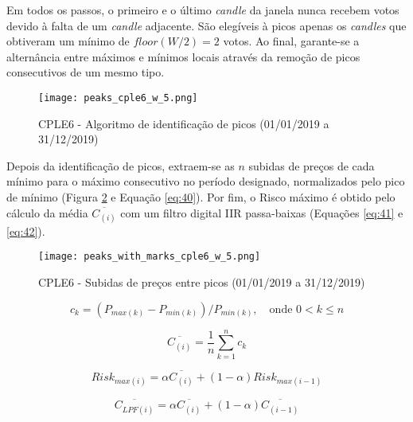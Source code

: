 \begin{itemize}
    Em todos os passos, o primeiro e o último \textit{candle} da janela nunca recebem votos devido à falta de um \textit{candle} adjacente. São elegíveis à picos apenas os \textit{candles} que obtiveram um mínimo de \begin{math}  floor(W / 2) = 2 \end{math} votos. Ao final, garante-se a alternância entre máximos e mínimos locais através da remoção de picos consecutivos de um mesmo tipo.

    \begin{figure}[!htb]
        \texttt{[image: peaks\_cple6\_w\_5.png]}
        \centering
        \caption{CPLE6 - Algoritmo de identificação de picos (01/01/2019 a 31/12/2019)}
        \label{fig:106}
    \end{figure}

    Depois da identificação de picos, extraem-se as \begin{math} n \end{math} subidas de preços de cada mínimo para o máximo consecutivo no período designado, normalizados pelo pico de mínimo (Figura \ref{fig:107} e Equação \ref{eq:40}). Por fim, o Risco máximo é obtido pelo cálculo da média \begin{math} \overline{C_{(i)}} \end{math} com um filtro digital IIR passa-baixas (Equações \ref{eq:41} e \ref{eq:42}).

    \begin{figure}[!htb]
        \texttt{[image: peaks\_with\_marks\_cple6\_w\_5.png]}
        \centering
        \caption{CPLE6 - Subidas de preços entre picos (01/01/2019 a 31/12/2019)}
        \label{fig:107}
    \end{figure}

    \begin{equation} \label{eq:40}
        c_k = (P_{max(k)} - P_{min(k)}) / P_{min(k)}, \quad \textrm{onde } 0 < k \le n
    \end{equation}

    \begin{equation} \label{eq:41}
        \overline{C_{(i)}} = \dfrac{1}{n} \sum_{k=1}^{n} c_k
    \end{equation}

    \begin{equation} \label{eq:42}
        Risk_{max(i)} = \alpha \overline{C_{(i)}} + (1 - \alpha) Risk_{max(i-1)}
    \end{equation}

    \begin{equation} \label{eq:43}
        \overline{C_{LPF(i)}} = \alpha \overline{C_{(i)}} + (1 - \alpha) \overline{C_{(i-1)}}
    \end{equation}


\end{itemize}
